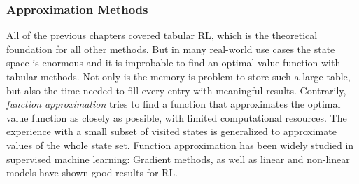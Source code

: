 \documentclass[a4paper, twoside, 12pt]{article}
\begin{document}
\subsubsection{Approximation Methods}
\label{sec:org5fdccc4}
All of the previous chapters covered tabular RL, which is the theoretical
foundation for all other methods. But in many real-world use cases the state
space is enormous and it is improbable to find an optimal value function with
tabular methods. Not only is the memory is problem to store such a large table,
but also the time needed to fill every entry with meaningful results.
Contrarily, \emph{function approximation} tries to find a function that approximates
the optimal value function as closely as possible, with limited computational
resources. The experience with a small subset of visited states is generalized
to approximate values of the whole state set. Function approximation has been
widely studied in supervised machine learning: Gradient methods, as well as
linear and non-linear models have shown good results for RL.
\end{document}
